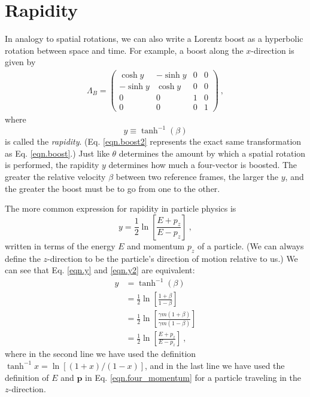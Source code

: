 \section{Rapidity}
In analogy to spatial rotations, we can also write a Lorentz boost as a hyperbolic rotation between space and time. For example, a boost along the $x$-direction is given by
\begin{align}
    \Lambda_B = \begin{pmatrix}
        \cosh{y} & -\sinh{y} & 0 & 0 \\
        -\sinh{y} & \cosh{y} & 0 & 0 \\
        0 & 0 & 1 & 0 \\
        0 & 0 & 0 & 1
    \end{pmatrix} \ , \label{eqn.boost2}
\end{align}
where
\begin{equation}
    y\equiv \tanh^{-1}(\beta) \label{eqn.y}
\end{equation}
is called the {\it rapidity}. (Eq. \eqref{eqn.boost2} represents the exact same transformation as Eq. \eqref{eqn.boost}.) Just like $\theta$ determines the amount by which a spatial rotation is performed, the rapidity $y$ determines how much a four-vector is boosted. The greater the relative velocity $\beta$ between two reference frames, the larger the $y$, and the greater the boost must be to go from one to the other. 

The more common expression for rapidity in particle physics is
\begin{equation}
    y = \frac{1}{2}\ln \left[ \frac{E+p_z}{E-p_z} \right] \ , \label{eqn.y2}
\end{equation}
written in terms of the energy $E$ and momentum $p_z$ of a particle. (We can always define the $z$-direction to be the particle's direction of motion relative to us.) We can see that Eq. \eqref{eqn.y} and \eqref{eqn.y2} are equivalent:
\begin{equation}
\begin{aligned}
    y &= \tanh^{-1}(\beta) \\
    &= \frac{1}{2}\ln \left[ \frac{1+\beta}{1-\beta} \right] \\
    &= \frac{1}{2}\ln \left[ \frac{\gamma m(1+\beta)}{\gamma m(1-\beta)} \right] \\
    &=\frac{1}{2}\ln \left[ \frac{E+p_z}{E-p_z} \right] \ ,
\end{aligned}
\end{equation}
where in the second line we have used the definition $\tanh^{-1}x = \ln [(1+x)/(1-x)]$, and in the last line we have used the definition of $E$ and $\mathbf{p}$ in Eq. \eqref{eqn.four_momentum} for a particle traveling in the $z$-direction.


